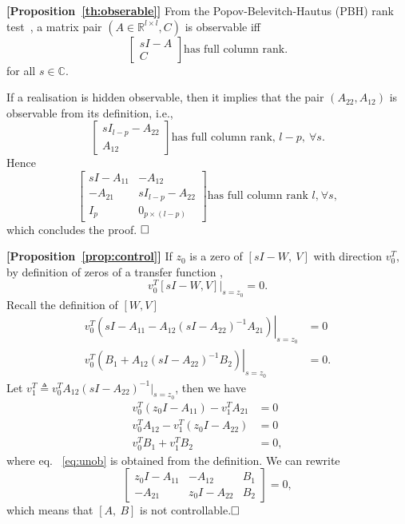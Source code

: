 \documentclass[twocolumn,12pt]{autart}
\theoremstyle{plain}
\newenvironment{proof}[1][Proof]{\begin{trivlist} \item[\hskip \labelsep {\bfseries #1}]}{\end{trivlist}}
\begin{document}
\begin{proof}
\textbf{[Proposition~\ref{th:obserable}]}
From the Popov-Belevitch-Hautus (PBH) rank test~\cite{zdg}, a matrix pair
  $({A}\in \mathbb{R}^{l \times l},{C})$ is observable iff
  \begin{equation}\label{eq:pbh}
    \begin{bmatrix} s{I}-{A}\\
      {C}\end{bmatrix}\text{has full column rank.}
  \end{equation}
  for all $s\in\mathbb{C}$. 
  
   If a realisation is hidden observable, then it implies that the
  pair $({A}_{22},{A}_{12})$ is observable from its definition, i.e.,
  \begin{equation*}  \begin{bmatrix}
      s{I}_{l-p}-{A}_{22}\\
      {A}_{12} \end{bmatrix} \text{has full column rank, $l-p$},~\forall s.
  \end{equation*}
  Hence
  \begin{equation*} \begin{bmatrix}
      s{I}-{A}_{11}&-{A}_{12}\\ -{A}_{21} &
      s{I}_{l-p}-{A}_{22}\\ {I}_p & {0}_{p \times
        (l-p)} \end{bmatrix}\text{has full column rank $l$,}~\forall s,
  \end{equation*}
  which concludes the proof. $\hfill \square$
  \end{proof}

\begin{proof}
\textbf{[Proposition~\ref{prop:control}]}
If $z_0$ is a zero of $[sI-W,~V]$ with direction $v_0^T$, by definition of zeros of a transfer function \cite{zdg},
$$v_0^T[sI-W,V]\big|_{s=z_0}=0.$$
Recall the definition of $[W,V]$
\begin{align*}
\left.v_0^{T}\left(sI-{A}_{11} - {A}_{12}\left ( s{I} -
  {A}_{22} \right )^{-1} {A}_{21}\right)\right\vert_{s=z_0}&=0\\
\left . v_0^T\left({B}_{1} +{A}_{12}\left ( s{I} - {A}_{22} \right
)^{-1} {B}_{2}\right)\right\vert_{s=z_0}&=0.
\end{align*}
Let $v_1^{T}\triangleq v_0^{T}{A}_{12}\left ( s{I} -
  {A}_{22} \right )^{-1}|_{s=z_0}$, then we have 
\begin{align}
v_0^{T}(z_0I-{A}_{11})-v_1^T{A}_{21}&=0\\
v_0^TA_{12}-v_1^T(z_0I-A_{22}) &=0 \label{eq:unob}\\
v_0^T{B}_{1} +v_1^T {B}_{2}&=0,
\end{align}
where eq. ~\eqref{eq:unob} is obtained from the definition.
We can rewrite
\begin{equation}
[v_0^T~v_1^T]\begin{bmatrix}
z_0I-A_{11} & -A_{12} & B_1\\
-A_{21} & z_0I-A_{22} & B_2
\end{bmatrix}=0,
\end{equation}
which means that $[A,~B]$ is not controllable.$\hfill \square$
\end{proof}
\end{document}

